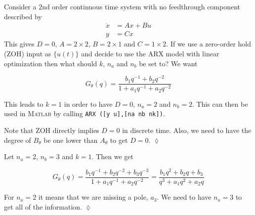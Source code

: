 \begin{example}
Consider a $2$nd order continuous time system with no feedthrough component described by
\begin{align*}
\dot{x} &= Ax + Bu \\
y &= Cx
\end{align*}
This gives $D=0$, $A=2\times 2$, $B=2\times 1$ and $C=1\times 2$.
If we use a zero-order hold (ZOH) input as $\{u(t)\}$ and decide to use the ARX model with linear optimization then what should $k$, $n_a$ and $n_b$ be set to? We want

\begin{equation*}
G_\theta(q) = \frac{b_1q^{-1}+b_2q^{-2}}{1+a_1q^{-1}+a_2q^{-2}}
\end{equation*}

This leads to $k=1$ in order to have $D=0$, $n_a=2$ and $n_b=2$.
This can then be used in \textsc{Matlab} by calling \texttt{ARX ([y u],[na nb nk])}.

Note that ZOH directly implies $D=0$ in discrete time.
Also, we need to have the degree of $B_\theta$ be one lower than $A_\theta$ to get $D=0$.
$\lozenge$
\end{example}

\begin{example}
Let $n_a=2$, $n_b=3$ and $k=1$.
Then we get

\begin{equation*}
G_\theta(q) = \frac{b_1q^{-1}+b_2q^{-2}+b_3q^{-3}}{1+a_1q^{-1}+a_2q^{-2}} = \frac{b_1q^2+b_2q+b_3}{q^3+a_1q^2+a_2q}
\end{equation*}

For $n_a=2$ it means that we are missing a pole, $a_3$.
We need to have $n_a=3$ to get all of the information.
$\lozenge$
\end{example}
